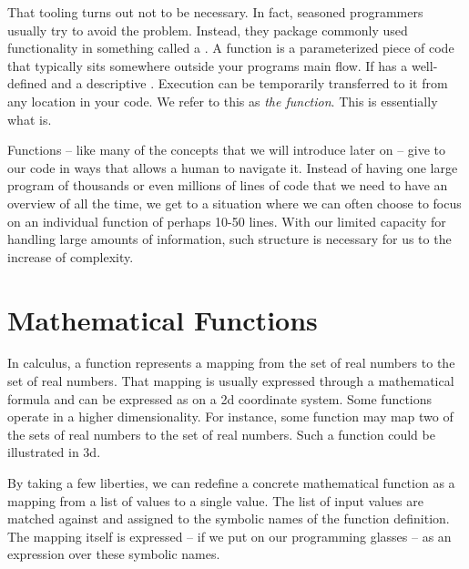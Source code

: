 That tooling turns out not to be necessary. In fact, seasoned programmers usually try to avoid the  problem. Instead, they package commonly used functionality in something called a . A function is a parameterized piece of code that typically sits somewhere outside your programs main flow. If has a well-defined  and a descriptive . Execution can be temporarily transferred to it from any location in your code. We refer to this as \textsl{ the function}. This is essentially what  is.

Functions -- like many of the concepts that we will introduce later on -- give  to our code in ways that allows a human to navigate it. Instead of having one large program of thousands or even millions of lines of code that we need to have an overview of all the time, we get to a situation where we can often choose to focus on an individual function of perhaps 10-50 lines. With our limited capacity for handling large amounts of information, such structure is necessary for us to  the increase of complexity.

\section{Mathematical Functions}

In calculus, a function represents a mapping from the set of real numbers to the set of real numbers. That mapping is usually expressed through a mathematical formula and can be expressed as on a 2d coordinate system. Some functions operate in a higher dimensionality. For instance, some function may map two of the sets of real numbers to the set of real numbers. Such a function could be illustrated in 3d.

By taking a few liberties, we can redefine a concrete mathematical function as a mapping from a list of values to a single value. The list of input values are matched against and assigned to the symbolic names of the function definition. The mapping itself is expressed -- if we put on our programming glasses -- as an expression over these symbolic names.

